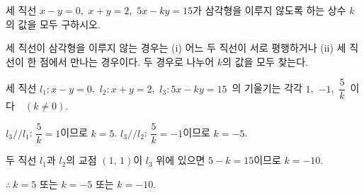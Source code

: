 \documentclass[10pt]{article}
\begin{document}

\begin{dmproblem}
세 직선 $x - y = 0$,\ $x + y = 2$,\ $5x - ky = 15$가 삼각형을 이루지 않도록 하는 상수 $k$의 값을 모두 구하시오.
\end{dmproblem}

\begin{dmapproach}
세 직선이 삼각형을 이루지 않는 경우는 (i) 어느 두 직선이 서로 평행하거나 (ii) 세 직선이 한 점에서 만나는 경우이다. 두 경우로 나누어 $k$의 값을 모두 찾는다.
\end{dmapproach}

\begin{dmsolution}
세 직선 $l_1 : x - y = 0$,\ $l_2 : x + y = 2$,\ $l_3 : 5x - ky = 15$\ 의 기울기는 각각 $1$,\ $-1$,\ $\dfrac{5}{k}$\ 이다$\quad(k \ne 0)$.

 $l_3 \mathbin{/\!/} l_1$: $\dfrac{5}{k} = 1$이므로 $k = 5$. $l_3 \mathbin{/\!/} l_2$: $\dfrac{5}{k} = -1$이므로 $k = -5$.

 두 직선 $l_1$과 $l_2$의 교점 $(1,\, 1)$이 $l_3$ 위에 있으면 $5 - k = 15$이므로 $k = -10$.

$\therefore\ k = 5$ 또는 $k = -5$ 또는 $k = -10$.
\end{dmsolution}

\dmchecktitle



\newpage

\dmconcepthead
{}
\end{document}
